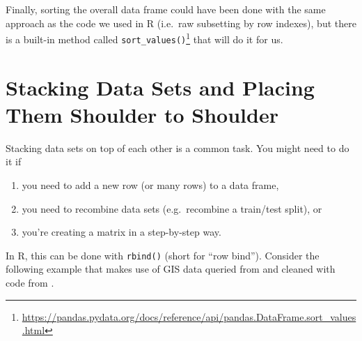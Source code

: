 \documentclass[
  12pt,
  krantz2]{krantz}
\providecommand{\tightlist}{%
  \setlength{\itemsep}{0pt}\setlength{\parskip}{0pt}}
\renewcommand{\href}[2]{#2\footnote{\url{#1}}}
\begin{document}
Finally, sorting the overall data frame could have been done with the same approach as the code we used in R (i.e.~raw subsetting by row indexes), but there is a built-in method called \href{https://pandas.pydata.org/docs/reference/api/pandas.DataFrame.sort_values.html}{\texttt{sort\_values()}} that will do it for us.

\hypertarget{stacking-data-sets-and-placing-them-shoulder-to-shoulder}{%
\section{Stacking Data Sets and Placing Them Shoulder to Shoulder}\label{stacking-data-sets-and-placing-them-shoulder-to-shoulder}}

Stacking data sets on top of each other is a common task. You might need to do it if

\begin{enumerate}
\def\labelenumi{\arabic{enumi}.}
\tightlist
\item
  you need to add a new row (or many rows) to a data frame,
\item
  you need to recombine data sets (e.g.~recombine a train/test split), or
\item
  you're creating a matrix in a step-by-step way.
\end{enumerate}

In R, this can be done with \texttt{rbind()} (short for ``row bind''). Consider the following example that makes use of GIS data queried from \citep{albemarle_county_gis_web} and cleaned with code from \citep{clay_ford}.
\end{document}
